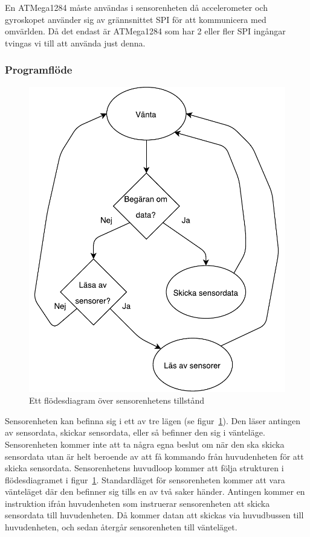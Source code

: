 \documentclass{article}
\begin{document}
En ATMega1284 måste användas i sensorenheten då accelerometer och gyroskopet använder sig av grännsnittet SPI för att kommunicera med omvärlden. Då det endast är ATMega1284 som har 2 eller fler SPI ingångar tvingas vi till att använda just denna.

\subsubsection{Programflöde}

\begin{figure}[H]
\centering
\includegraphics[scale=0.6]{sensorenhet_flowchart}
\caption{Ett flödesdiagram över sensorenhetens tillstånd}
\label{fig:sensorenhet_flowchart}
\end{figure}
Sensorenheten kan befinna sig i ett av tre lägen (se figur~\ref{fig:sensorenhet_flowchart}). Den läser antingen av sensordata, skickar sensordata, eller så befinner den sig i vänteläge. Sensorenheten kommer inte att ta några egna beslut om när den ska  skicka sensordata utan är helt beroende av att få kommando från huvudenheten för att skicka sensordata. Sensorenhetens huvudloop kommer att följa strukturen i flödesdiagramet i figur~\ref{fig:sensorenhet_flowchart}. Standardläget för sensorenheten kommer att vara vänteläget där den befinner sig tills en av två saker händer. Antingen kommer en instruktion ifrån huvudenheten som instruerar sensorenheten att skicka sensordata till huvudenheten. Då kommer datan att skickas via huvudbussen till huvudenheten, och sedan återgår sensorenheten till vänteläget. 
\end{document}
